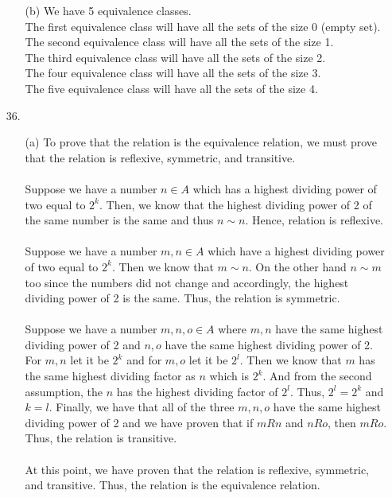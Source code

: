 \documentclass[12pt, a4paper]{article}
\begin{document}
\begin{itemize}
\begin{itemize}
\item[]

\item[(b)]
We have 5 equivalence classes.\\
The first equivalence class will have all the sets of the size 0 (empty set).\\
The second equivalence class will have all the sets of the size 1.\\
The third equivalence class will have all the sets of the size 2.\\
The four equivalence class will have all the sets of the size 3.\\
The five equivalence class will have all the sets of the size 4.
\end{itemize}

\item[]
\item[]

\item[36.]
\begin{itemize}
\item[(a)]
To prove that the relation is the equivalence relation, we must prove that the
relation is reflexive, symmetric, and transitive.\\\\
Suppose we have a number $n \in A$ which has a highest dividing power of two equal to $2^k$.
Then, we know that the highest dividing power of 2 of the same number is the same and thus $n \sim n$.
Hence, relation is reflexive.\\\\
Suppose we have a number $m, n \in A$ which have a highest dividing power of two equal to $2^k$.
Then we know that $m \sim n$. On the other hand $n \sim m$ too since the numbers did not change and
accordingly, the highest dividing power of 2 is the same. Thus, the relation is symmetric.\\\\
Suppose we have a number $m, n, o \in A$ where $m, n$ have the same highest dividing power of 2 and
$n, o$ have the same highest dividing power of 2. For $m, n$ let it be $2^k$ and for $m, o$ let it be $2^l$.
Then we know that $m$ has the same highest dividing factor as $n$ which is $2^k$. And from the second assumption,
the $n$ has the highest dividing factor of $2^l$. Thus, $2^l = 2^k$ and $k = l$. Finally, we have that all of the three
$m, n, o$ have the same highest dividing power of 2 and we have proven that if $m R n$ and $n R o$, then $m R o$.
Thus, the relation is transitive.\\\\
At this point, we have proven that the relation is reflexive, symmetric, and transitive. Thus, the relation is the equivalence relation.


\end{itemize}
\end{itemize}
\end{document}
